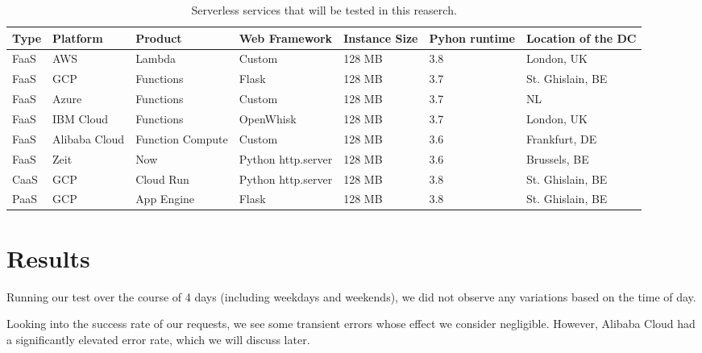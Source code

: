 \documentclass[11pt]{article}
\begin{document}
\begin{table}
\begin{adjustwidth}{-0.9cm}{}
 \begin{tabularx}{1.1\textwidth}{p{1cm} X X X X X p{3cm}}
 \textbf{Type} & \textbf{Platform} & \textbf{Product} & \textbf{Web Framework} & \textbf{Instance Size} & \textbf{Pyhon runtime} & \textbf{Location of the DC} \\
 \hline
 \hline
 FaaS & AWS & Lambda & Custom & 128 MB & 3.8 & London, UK \\
 \hline
 FaaS & GCP & Functions & Flask & 128 MB & 3.7 & St. Ghislain, BE \\
 \hline
 FaaS & Azure & Functions & Custom & 128 MB & 3.7 & NL \\
 \hline
 FaaS & IBM Cloud & Functions & OpenWhisk & 128 MB & 3.7 & London, UK\\
 \hline
 FaaS & Alibaba Cloud & Function Compute & Custom & 128 MB & 3.6 & Frankfurt, DE\\
 \hline
 FaaS & Zeit & Now & Python http.server  & 128 MB & 3.6 & Brussels, BE\\
 \hline
 CaaS & GCP & Cloud Run & Python http.server & 128 MB & 3.8 & St. Ghislain, BE\\
 \hline
 PaaS & GCP & App Engine & Flask & 128 MB & 3.8 & St. Ghislain, BE\\
 \hline

\end{tabularx}
\caption{Serverless services that will be tested in this reaserch.}
\label{Tab:services}
\end{adjustwidth}
\end{table}




\section{Results}

Running our test over the course of 4 days (including weekdays and weekends),
we did not observe any variations based on the time of day.



Looking into the success rate of our requests,
we see some transient errors whose effect we consider negligible.
However, Alibaba Cloud had a significantly elevated error rate,
which we will discuss later.
\end{document}
